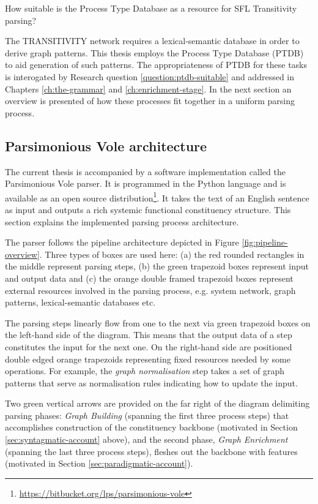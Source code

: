\begin{question}\label{question:ptdb-suitable}
    How suitable is the Process Type Database as a resource for SFL Transitivity parsing? 
\end{question}


The TRANSITIVITY network requires a lexical-semantic database in order to derive graph patterns. This thesis employs the Process Type Database (PTDB) \citep{Neale2002} to aid generation of such patterns. The appropriateness of PTDB for these tasks is interogated by Research question \ref{question:ptdb-suitable} and addressed in Chapters \ref{ch:the-grammar} and \ref{ch:enrichment-stage}. In the next section an overview is presented of how these processes fit together in a uniform parsing process.

\subsection{Parsimonious Vole architecture}
\label{sec:architecture}
The current thesis is accompanied by a software implementation called the Parsimonious Vole parser. It is programmed in the Python language and is available as an open source distribution\footnote{\url{https://bitbucket.org/lps/parsimonious-vole}}. It takes the text of an English sentence as input and outputs a rich systemic functional constituency structure. This section explains the implemented parsing process architecture.

The parser follows the pipeline architecture depicted in Figure \ref{fig:pipeline-overview}. Three types of boxes are used here: (a) the red rounded rectangles in the middle represent parsing steps, (b) the green trapezoid boxes represent input and output data and (c) the orange double framed trapezoid boxes represent external resources involved in the parsing process, e.g. system network, graph patterns, lexical-semantic databases etc. 

The parsing steps linearly flow from one to the next via green trapezoid boxes on the left-hand side of the diagram. This means that the output data of a step constitutes the input for the next one. On the right-hand side are positioned double edged orange trapezoids representing fixed resources needed by some operations. For example, the \textit{graph normalisation} step takes a set of graph patterns that serve as normalisation rules indicating how to update the input.

Two green vertical arrows are provided on the far right of the diagram delimiting parsing phases: \textit{Graph Building} (spanning the first three process steps) that accomplishes construction of the constituency backbone (motivated in Section \ref{sec:syntagmatic-account} above), and the second phase, \textit{Graph Enrichment} (spanning the last three process steps), fleshes out the backbone with features (motivated in Section \ref{sec:paradigmatic-account}).

